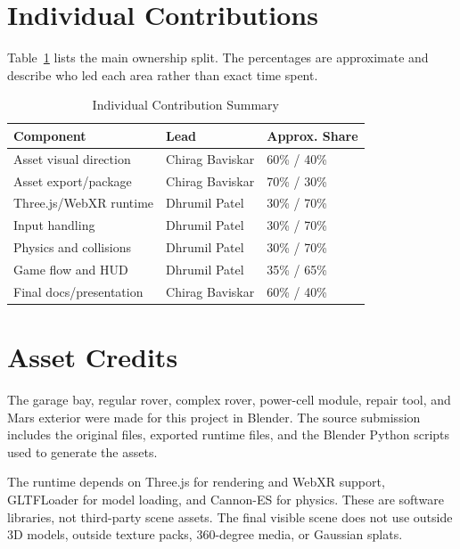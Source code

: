 \documentclass[conference]{IEEEtran}
\begin{document}
\section{Individual Contributions}

Table~\ref{tab:contributions} lists the main ownership split. The percentages
are approximate and describe who led each area rather than exact time spent.

\begin{table}[b]
	\caption{Individual Contribution Summary}\label{tab:contributions}
	\centering
	\footnotesize
	\begin{tabular}{lll}
		\toprule
		\textbf{Component}      & \textbf{Lead}   & \textbf{Approx. Share} \\
		\midrule
		Asset visual direction  & Chirag Baviskar & 60\% / 40\%            \\
		Asset export/package    & Chirag Baviskar & 70\% / 30\%            \\
		Three.js/WebXR runtime  & Dhrumil Patel   & 30\% / 70\%            \\
		Input handling          & Dhrumil Patel   & 30\% / 70\%            \\
		Physics and collisions  & Dhrumil Patel   & 30\% / 70\%            \\
		Game flow and HUD       & Dhrumil Patel   & 35\% / 65\%            \\
		Final docs/presentation & Chirag Baviskar & 60\% / 40\%            \\
		\bottomrule
	\end{tabular}
\end{table}

\section{Asset Credits}

The garage bay, regular rover, complex rover, power-cell module, repair tool,
and Mars exterior were made for this project in Blender. The source submission
includes the original  files, exported  runtime files,
and the Blender Python scripts used to generate the assets.

The runtime depends on Three.js for rendering and WebXR support, GLTFLoader for
model loading, and Cannon-ES for physics. These are software libraries, not
third-party scene assets. The final visible scene does not use outside 3D
models, outside texture packs, 360-degree media, or Gaussian splats.
\end{document}
